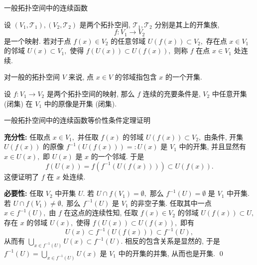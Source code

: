 
\begin{frame}{一般拓扑空间中的连续函数}

\begin{Def}
设 $(V_1, \mathscr{T}_1), (V_2, \mathscr{T}_2)$ 是两个拓扑空间, $\mathscr{T}_1, \mathscr{T}_2$ 分别是其上的开集族,
\[f: V_1 \rightarrow V_2\]
是一个映射. 若对于点 $f(x) \in V_2$ 的任意邻域 $U(f(x)) \subset V_2,$ 存在点 $x \in V_1$ 的邻域 $U(x) \subset V_1,$ 使得 $f(U(x)) \subset U(f(x)),$ 则称 $f$ 在点 $x \in V_1$ 处连续.
\end{Def}

\pause
\vspace{0.5em}

对一般的拓扑空间 $V$ 来说, 点 $x \in V$ 的邻域指包含 $x$ 的一个开集.

\pause
\vspace{0.5em}

\begin{thm}
设 $f: V_1 \rightarrow V_2$ 是两个拓扑空间的映射, 那么 $f$ 连续的充要条件是, $V_2$ 中任意开集 (闭集) 在 $V_1$ 中的原像是开集 (闭集).
\end{thm}

\end{frame}


\begin{frame}{一般拓扑空间中的连续函数等价性条件定理证明}

\textbf{充分性:} 任取点 $x \in V_1,$ 并任取 $f(x)$ 的邻域 $U(f(x)) \subset V_2,$ 由条件, 开集 $U(f(x))$ 的原像 $f^{-1}(U(f(x))) =: U(x)$ 是 $V_1$ 中的开集, 并且显然有 $x \in U(x),$ 即 $U(x)$ 是 $x$ 的一个邻域. 于是
\[f(U(x)) = f \left( f^{-1}(U(f(x))) \right) \subset U(f(x)).\]
这便证明了 $f$ 在 $x$ 处连续.

\pause
\vspace{1em}

\textbf{必要性:} 任取 $V_2$ 中开集 $U.$ 若 $U \cap f(V_1) = \emptyset,$ 那么 $f^{-1}(U) = \emptyset$ 是 $V_1$ 中开集. 若 $U \cap f(V_1) \neq \emptyset,$ 那么 $f^{-1}(U)$ 是 $V_1$ 的非空子集. 任取其中一点 $x \in f^{-1}(U),$ 由 $f$ 在这点的连续性知, 任取 $f(x) \in V_2$ 的邻域 $U(f(x)) \subset U,$ 存在 $x$ 的邻域 $U(x),$ 使得 $f(U(x)) \subset U(f(x)),$ 即有
\[U(x) \subset f^{-1}(U(f(x))) \subset f^{-1}(U),\]
从而有 $\bigcup\limits_{x \in f^{-1}(U)} U(x) \subset f^{-1}(U).$ 相反的包含关系是显然的, 于是 $f^{-1}(U) = \bigcup\limits_{x \in f^{-1}(U)} U(x)$ 是 $V_1$ 中的开集的并集, 从而也是开集.
\qed


\end{frame}

